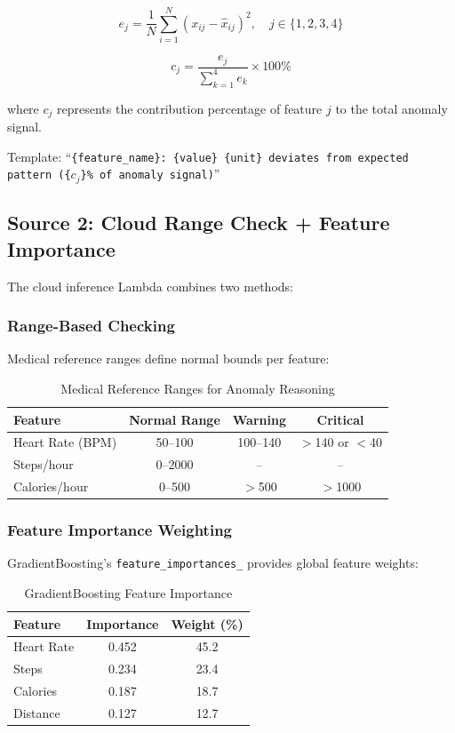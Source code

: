 \documentclass[conference]{IEEEtran}
\begin{document}
\begin{equation}
e_j = \frac{1}{N} \sum_{i=1}^{N} (x_{ij} - \hat{x}_{ij})^2, \quad j \in \{1, 2, 3, 4\}
\end{equation}

\begin{equation}
c_j = \frac{e_j}{\sum_{k=1}^{4} e_k} \times 100\%
\end{equation}

where $c_j$ represents the contribution percentage of feature $j$ to the total anomaly signal.

Template: ``\texttt{\{feature\_name\}: \{value\} \{unit\} deviates from expected pattern (\{$c_j$\}\% of anomaly signal)}''

\subsection{Source 2: Cloud Range Check + Feature Importance}
The cloud inference Lambda combines two methods:

\subsubsection{Range-Based Checking}
Medical reference ranges define normal bounds per feature:

\begin{table}[H]
\centering
\caption{Medical Reference Ranges for Anomaly Reasoning}
\label{tab:ranges}
\begin{tabular}{lccc}
\toprule
\textbf{Feature} & \textbf{Normal Range} & \textbf{Warning} & \textbf{Critical} \\
\midrule
Heart Rate (BPM) & 50--100 & 100--140 & $>$140 or $<$40 \\
Steps/hour & 0--2000 & -- & -- \\
Calories/hour & 0--500 & $>$500 & $>$1000 \\
\bottomrule
\end{tabular}
\end{table}

\subsubsection{Feature Importance Weighting}
GradientBoosting's \texttt{feature\_importances\_} provides global feature weights:

\begin{table}[H]
\centering
\caption{GradientBoosting Feature Importance}
\label{tab:gb_importance}
\begin{tabular}{lcc}
\toprule
\textbf{Feature} & \textbf{Importance} & \textbf{Weight (\%)} \\
\midrule
Heart Rate & 0.452 & 45.2 \\
Steps & 0.234 & 23.4 \\
Calories & 0.187 & 18.7 \\
Distance & 0.127 & 12.7 \\
\bottomrule
\end{tabular}
\end{table}
\end{document}
